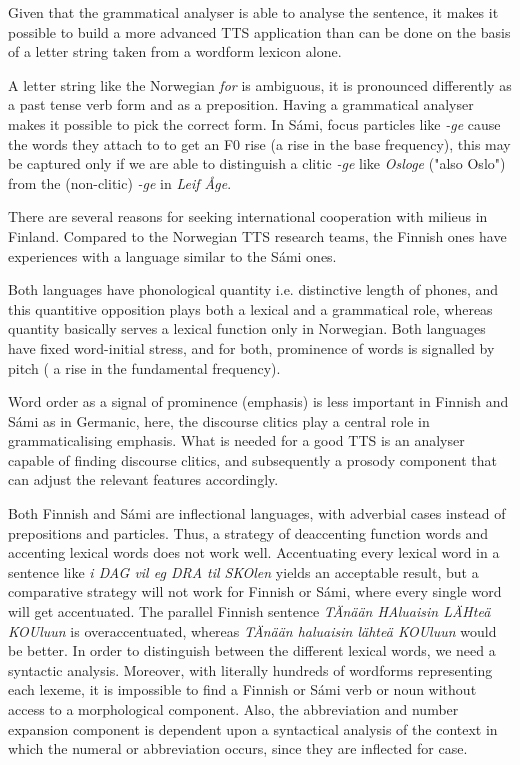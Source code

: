 \documentclass[a4paper,english]{article}
\begin{document}
Given that the grammatical analyser is able to analyse the sentence, it makes it possible to build a more advanced TTS application than can be done on the basis of a letter string taken from a wordform lexicon alone.

A letter string like the Norwegian \textit{for} is ambiguous, it is pronounced differently as a past tense verb form and as a preposition. Having a grammatical analyser makes it possible to pick the correct form. In Sámi, focus particles like \textit{-ge} cause the words they attach to to get an F0 rise (a rise in the base frequency), this may be captured only if we are able to distinguish a clitic \textit{-ge} like \textit{Osloge} ("also Oslo") from the (non-clitic)  \textit{-ge} in \textit{Leif Åge}.

There are several reasons for seeking international cooperation with milieus in Finland. Compared to the Norwegian TTS research teams, the Finnish ones have experiences with a language similar to the Sámi ones.

Both languages have phonological quantity i.e. distinctive length of phones, and this quantitive opposition plays both a lexical and a grammatical role, whereas quantity basically serves a lexical function only in Norwegian. Both languages have fixed word-initial stress, and for both, prominence of words is signalled by pitch ( a rise in the fundamental frequency). 

Word order as a signal of prominence (emphasis) is less important in Finnish and Sámi as in Germanic, here, the discourse clitics play a central role in grammaticalising emphasis. What is needed for a good TTS is an analyser capable of finding discourse clitics, and subsequently a prosody component that can adjust the relevant features accordingly.

Both Finnish and Sámi are inflectional languages, with adverbial cases instead of prepositions and particles. Thus, a strategy of deaccenting function words and accenting lexical words does not work well. Accentuating every lexical word in a sentence like \textit{i DAG vil eg DRA til SKOlen} yields an acceptable result, but a comparative strategy will not work for Finnish or Sámi, where every single word will get accentuated. The parallel Finnish sentence \textit{TÄnään HAluaisin LÄHteä KOUluun} is overaccentuated, whereas \textit{TÄnään haluaisin lähteä KOUluun} would be better. In order to distinguish between the different lexical words, we need a syntactic analysis. Moreover, with literally hundreds of wordforms representing each lexeme, it is impossible to find a Finnish or Sámi verb or noun without access to a morphological component. Also, the abbreviation and number expansion component is dependent upon a syntactical analysis of the context in which the numeral or abbreviation occurs, since they are inflected for case.
\end{document}
